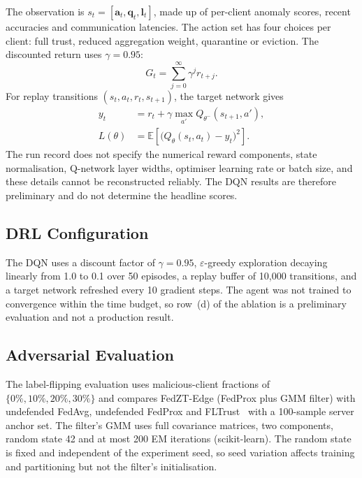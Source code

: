 \documentclass[iicol,Numbered]{sn-jnl}
\begin{document}
The observation is $s_t=[\mathbf{a}_t,\mathbf{q}_t,\mathbf{l}_t]$, made up of
per-client anomaly scores, recent accuracies and communication latencies. The
action set has four choices per client: full trust, reduced aggregation weight,
quarantine or eviction. The discounted return uses $\gamma=0.95$:
\begin{equation}
G_t=\sum_{j=0}^{\infty}\gamma^j r_{t+j}.
\end{equation}
For replay transitions $(s_t,a_t,r_t,s_{t+1})$, the target network gives
\begin{equation}
\begin{aligned}
y_t &= r_t+\gamma\max_{a'}Q_{\theta^-}(s_{t+1},a'),\\
L(\theta) &= \mathbb{E}\!\left[\bigl(Q_\theta(s_t,a_t)-y_t\bigr)^2\right].
\end{aligned}
\end{equation}
The run record does not specify the numerical reward components, state
normalisation, Q-network layer widths, optimiser learning rate or batch size,
and these details cannot be reconstructed reliably. The DQN results are
therefore preliminary and do not determine the headline scores.

\subsection{DRL Configuration}

The DQN uses a discount factor of $\gamma=0.95$, $\varepsilon$-greedy
exploration decaying linearly from 1.0 to 0.1 over 50 episodes, a replay buffer
of 10,000 transitions, and a target network refreshed every 10 gradient steps.
The agent was not trained to convergence within the time budget, so row~(d) of
the ablation is a preliminary evaluation and not a production result.

\subsection{Adversarial Evaluation}

The label-flipping evaluation uses malicious-client fractions of
$\{0\%,10\%,20\%,30\%\}$ and compares FedZT-Edge (FedProx plus GMM filter) with
undefended FedAvg, undefended FedProx and FLTrust~\cite{cao2021fltrust} with a
100-sample server anchor set. The filter's GMM uses full covariance matrices,
two components, random state 42 and at most 200 EM iterations (scikit-learn).
The random state is fixed and independent of the experiment seed, so seed
variation affects training and partitioning but not the filter's initialisation.
\end{document}
